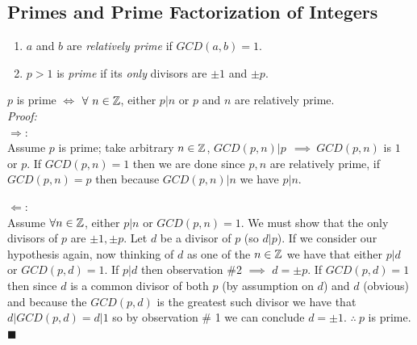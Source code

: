 \subsection{Primes and Prime Factorization of Integers}
\begin{definition}
\begin{enumerate}
    \item $a$ and $b$ are \textit{relatively prime} if $GCD(a,b)=1$.
    \item $p>1$ is \textit{prime} if its \textit{only} divisors are $\pm 1$ and $\pm p$.
\end{enumerate}
\end{definition}
\begin{proposition}
$p$ is prime $\iff$ $\forall \ n \in {\mathbb{Z}} $, either $p|n$ or $p$ and $n$ are relatively prime.\\
\textit{Proof:} \\
\textbf{$\Rightarrow :$}\\
Assume $p$ is prime; take arbitrary $n\in{\mathbb{Z}}$, $GCD(p,n)|p\ \ \implies \ GCD(p,n)$ is $1$ or $p$. If
$GCD(p,n)=1$ then we are done since $p,n$ are relatively prime, if $GCD(p,n)=p$ then because
$GCD(p,n)|n$ we have $p|n$.\steezybreak

\noindent \textbf{$\Leftarrow :$}\\
Assume $\forall n \in {\mathbb{Z}}$, either $p|n$ or $GCD(p,n)=1$. We must show that the only divisors of $p$
are $\pm 1, \pm p$. Let $d$ be a divisor of $p$ (so $d|p$). If we consider our hypothesis again, now
thinking of $d$ as one of the $n\in{\mathbb{Z}}$ we have that either $p|d$ or $GCD(p,d)=1$. If $p|d$ then
observation \#2 $\implies$ $d=\pm p$. If $GCD(p,d)=1$ then since $d$ is a common divisor of both $p$
(by assumption on $d$) and $d$ (obvious) and because the $GCD(p,d)$ is the greatest such divisor we
have that $d|GCD(p,d)=d|1$ so by observation \# 1 we can conclude $d=\pm 1$. $\therefore \ p$ is
prime. $\blacksquare$
\end{proposition}

